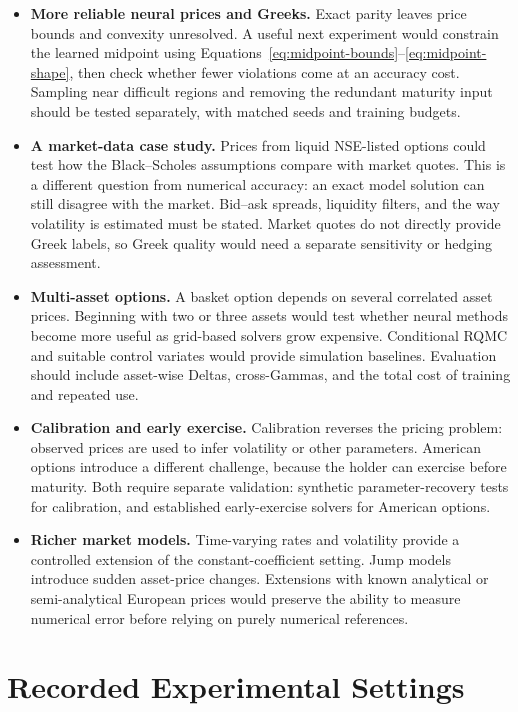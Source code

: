 \documentclass[11pt,a4paper]{article}
\begin{document}
\begin{itemize}
\item \textbf{More reliable neural prices and Greeks.} Exact parity leaves price bounds and convexity unresolved. A useful next experiment would constrain the learned midpoint using Equations~\eqref{eq:midpoint-bounds}--\eqref{eq:midpoint-shape}, then check whether fewer violations come at an accuracy cost. Sampling near difficult regions and removing the redundant maturity input should be tested separately, with matched seeds and training budgets.
\item \textbf{A market-data case study.} Prices from liquid NSE-listed options could test how the Black--Scholes assumptions compare with market quotes. This is a different question from numerical accuracy: an exact model solution can still disagree with the market. Bid--ask spreads, liquidity filters, and the way volatility is estimated must be stated. Market quotes do not directly provide Greek labels, so Greek quality would need a separate sensitivity or hedging assessment.
\item \textbf{Multi-asset options.} A basket option depends on several correlated asset prices. Beginning with two or three assets would test whether neural methods become more useful as grid-based solvers grow expensive. Conditional RQMC and suitable control variates would provide simulation baselines. Evaluation should include asset-wise Deltas, cross-Gammas, and the total cost of training and repeated use.
\item \textbf{Calibration and early exercise.} Calibration reverses the pricing problem: observed prices are used to infer volatility or other parameters. American options introduce a different challenge, because the holder can exercise before maturity. Both require separate validation: synthetic parameter-recovery tests for calibration, and established early-exercise solvers for American options.
\item \textbf{Richer market models.} Time-varying rates and volatility provide a controlled extension of the constant-coefficient setting. Jump models introduce sudden asset-price changes. Extensions with known analytical or semi-analytical European prices would preserve the ability to measure numerical error before relying on purely numerical references.
\end{itemize}

\clearpage
\appendix
\section{Recorded Experimental Settings}
\label{sec:reproducibility}
\end{document}
